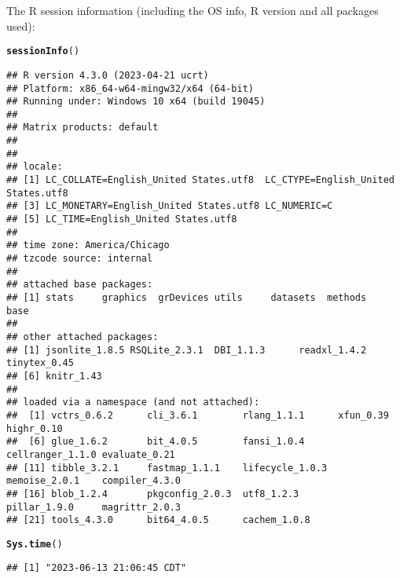 \documentclass{article}\usepackage[]{graphicx}\usepackage[]{xcolor}
\makeatletter
\newcommand{\hlstd}[1]{\textcolor[rgb]{0.345,0.345,0.345}{#1}}%
\newcommand{\hlkwd}[1]{\textcolor[rgb]{0.737,0.353,0.396}{\textbf{#1}}}%
\newenvironment{kframe}{%
 \def\at@end@of@kframe{}%
 \ifinner\ifhmode%
  \def\at@end@of@kframe{\end{minipage}}%
  \begin{minipage}{\columnwidth}%
 \fi\fi%
 \def\FrameCommand##1{\hskip\@totalleftmargin \hskip-\fboxsep
 \colorbox{shadecolor}{##1}\hskip-\fboxsep
     \hskip-\linewidth \hskip-\@totalleftmargin \hskip\columnwidth}%
 \MakeFramed {\advance\hsize-\width
   \@totalleftmargin\z@ \linewidth\hsize
   \@setminipage}}%
 {\par\unskip\endMakeFramed%
 \at@end@of@kframe}
\newenvironment{knitrout}{}{} %
\makeatother
\begin{document}
The R session information (including the OS info, R version and all
packages used):

\begin{knitrout}
\color{fgcolor}\begin{kframe}
\begin{alltt}
\hlkwd{sessionInfo}\hlstd{()}
\end{alltt}
\begin{verbatim}
## R version 4.3.0 (2023-04-21 ucrt)
## Platform: x86_64-w64-mingw32/x64 (64-bit)
## Running under: Windows 10 x64 (build 19045)
## 
## Matrix products: default
## 
## 
## locale:
## [1] LC_COLLATE=English_United States.utf8  LC_CTYPE=English_United States.utf8   
## [3] LC_MONETARY=English_United States.utf8 LC_NUMERIC=C                          
## [5] LC_TIME=English_United States.utf8    
## 
## time zone: America/Chicago
## tzcode source: internal
## 
## attached base packages:
## [1] stats     graphics  grDevices utils     datasets  methods   base     
## 
## other attached packages:
## [1] jsonlite_1.8.5 RSQLite_2.3.1  DBI_1.1.3      readxl_1.4.2   tinytex_0.45  
## [6] knitr_1.43    
## 
## loaded via a namespace (and not attached):
##  [1] vctrs_0.6.2      cli_3.6.1        rlang_1.1.1      xfun_0.39        highr_0.10      
##  [6] glue_1.6.2       bit_4.0.5        fansi_1.0.4      cellranger_1.1.0 evaluate_0.21   
## [11] tibble_3.2.1     fastmap_1.1.1    lifecycle_1.0.3  memoise_2.0.1    compiler_4.3.0  
## [16] blob_1.2.4       pkgconfig_2.0.3  utf8_1.2.3       pillar_1.9.0     magrittr_2.0.3  
## [21] tools_4.3.0      bit64_4.0.5      cachem_1.0.8
\end{verbatim}
\begin{alltt}
\hlkwd{Sys.time}\hlstd{()}
\end{alltt}
\begin{verbatim}
## [1] "2023-06-13 21:06:45 CDT"
\end{verbatim}
\end{kframe}
\end{knitrout}
\end{document}
